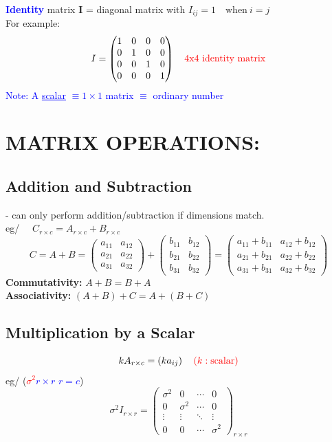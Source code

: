 \documentclass[14pt]{extarticle}
\begin{document}
\textcolor{blue}{\textbf{Identity}} matrix $\mathbf{I}$ = diagonal matrix with 
$I_{ij} = 1 \quad \text{when} \ i = j $ \\
For example:
\[
I = \begin{pmatrix}
1 & 0 & 0 & 0 \\
0 & 1 & 0 & 0 \\
0 & 0 & 1 & 0 \\
0 & 0 & 0 & 1
\end{pmatrix}
\quad \textcolor{red}{\text{4x4 identity matrix}}
\]
\textcolor{blue}{Note: A \underline{scalar} $\equiv 1 \times 1$ matrix $\equiv$ ordinary number} \\

\section*{MATRIX OPERATIONS:}

\subsection*{Addition and Subtraction}

\noindent
- can only perform addition/subtraction if dimensions match.\\
eg/ $\quad C_{r \times c} = A_{r \times c} + B_{r \times c}$
\[
C = A + B = 
\begin{pmatrix}
a_{11} & a_{12} \\
a_{21} & a_{22} \\
a_{31} & a_{32}
\end{pmatrix}
+ 
\begin{pmatrix}
b_{11} & b_{12} \\
b_{21} & b_{22} \\
b_{31} & b_{32}
\end{pmatrix}
= 
\begin{pmatrix}
a_{11} + b_{11} & a_{12} + b_{12} \\
a_{21} + b_{21} & a_{22} + b_{22} \\
a_{31} + b_{31} & a_{32} + b_{32}
\end{pmatrix}
\]
\textbf{Commutativity:} \quad $A + B = B + A$\\
\textbf{Associativity:} \quad $(A + B) + C = A + (B + C)$

\subsection*{Multiplication by a Scalar}

\[
k A_{r \times c} = \left( k a_{ij} \right)
\quad \textcolor{red}{(k: \text{scalar})}
\]
\noindent
eg/ \quad (\textcolor{red}{$\sigma^2$}\textcolor{blue}{$r \times r$ $ r = c$})
\[
\sigma^2 I_{r \times r} = 
\begin{pmatrix}
\sigma^2 & 0 & \cdots & 0 \\
0 & \sigma^2 & \cdots & 0 \\
\vdots & \vdots & \ddots & \vdots \\
0 & 0 & \cdots & \sigma^2
\end{pmatrix}_{r \times r}
\]
\end{document}
